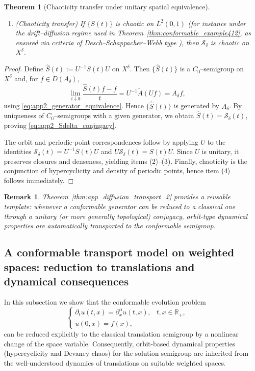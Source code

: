 \documentclass[preprint,12pt]{elsarticle}
\newtheorem{theorem}{Theorem}
\newtheorem{remark}{Remark}
\newtheorem{proof}{Proof}
\newcommand{\R}{\mathbb {R}}
\begin{document}
\begin{theorem}[Chaoticity transfer under unitary spatial equivalence]
\begin{enumerate}
\item \emph{(Chaoticity transfer)} If $\{S(t)\}$ is chaotic on $L^2(0,1)$
(for instance under the drift--diffusion regime used in
Theorem~\ref{thm:conformable_example412}, as ensured via criteria of
Desch--Schappacher--Webb type \cite{desch1997}),
then $\mathcal S_\delta$ is chaotic on $X^\delta$.
\end{enumerate}
\end{theorem}

\begin{proof}
Define $\widehat S(t):=U^{-1}S(t)U$ on $X^\delta$.
Then $\{\widehat S(t)\}$ is a $C_0$--semigroup on $X^\delta$ and, for $f\in D(A_\delta)$,
\[
\lim_{t\downarrow0}\frac{\widehat S(t)f-f}{t}
=
U^{-1}\widetilde A(Uf)
=
A_\delta f,
\]
using \eqref{eq:app2_generator_equivalence}.
Hence $\{\widehat S(t)\}$ is generated by $A_\delta$.
By uniqueness of $C_0$--semigroups with a given generator, we obtain
$\widehat S(t)=\mathcal S_\delta(t)$, proving \eqref{eq:app2_Sdelta_conjugacy}.

The orbit and periodic-point correspondences follow by applying $U$ to the identities
$\mathcal S_\delta(t)=U^{-1}S(t)U$ and $U\mathcal S_\delta(t)=S(t)U$.
Since $U$ is unitary, it preserves closures and denseness, yielding items (2)--(3).
Finally, chaoticity is the conjunction of hypercyclicity and density of periodic points,
hence item (4) follows immediately.
\end{proof}

\begin{remark}
Theorem~\ref{thm:app_diffusion_transport_2} provides a reusable template:
whenever a conformable generator can be reduced to a classical one through a unitary
(or more generally topological) conjugacy, orbit-type dynamical properties are
automatically transported to the conformable semigroup.
\end{remark}

\subsection{A conformable transport model on weighted spaces: reduction to translations and dynamical consequences}
\label{subsec:app_conformable_transport}

In this subsection we show that the conformable evolution problem
\begin{equation}\label{eq:app_conf_transport_pde}
\begin{cases}
\partial_t u(t,x)=\partial_x^\alpha u(t,x), & t,x\in\R_+,\\
u(0,x)=f(x),
\end{cases}
\end{equation}
can be reduced explicitly to the classical translation semigroup by a nonlinear
change of the space variable.
Consequently, orbit-based dynamical properties (hypercyclicity and Devaney chaos)
for the solution semigroup are inherited from the well-understood dynamics of
translations on suitable weighted spaces.
\end{document}
